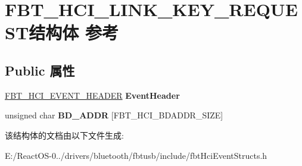 \hypertarget{struct_f_b_t___h_c_i___l_i_n_k___k_e_y___r_e_q_u_e_s_t}{}\section{F\+B\+T\+\_\+\+H\+C\+I\+\_\+\+L\+I\+N\+K\+\_\+\+K\+E\+Y\+\_\+\+R\+E\+Q\+U\+E\+S\+T结构体 参考}
\label{struct_f_b_t___h_c_i___l_i_n_k___k_e_y___r_e_q_u_e_s_t}
\subsection*{Public 属性}
\begin{DoxyCompactItemize}
\item 
\mbox{\label{struct_f_b_t___h_c_i___l_i_n_k___k_e_y___r_e_q_u_e_s_t_adccb5a7b7c77d77d135d11d0e5f7336f}} 
\hyperlink{struct_f_b_t___h_c_i___e_v_e_n_t___h_e_a_d_e_r}{F\+B\+T\+\_\+\+H\+C\+I\+\_\+\+E\+V\+E\+N\+T\+\_\+\+H\+E\+A\+D\+ER} {\bfseries Event\+Header}
\item 
\mbox{\label{struct_f_b_t___h_c_i___l_i_n_k___k_e_y___r_e_q_u_e_s_t_ac48926d6927cd716a3e3e10f0ce7016d}} 
unsigned char {\bfseries B\+D\+\_\+\+A\+D\+DR} \mbox{[}F\+B\+T\+\_\+\+H\+C\+I\+\_\+\+B\+D\+A\+D\+D\+R\+\_\+\+S\+I\+ZE\mbox{]}
\end{DoxyCompactItemize}


该结构体的文档由以下文件生成\+:\begin{DoxyCompactItemize}
\item 
E\+:/\+React\+O\+S-\/0../drivers/bluetooth/fbtusb/include/fbt\+Hci\+Event\+Structs.\+h\end{DoxyCompactItemize}
